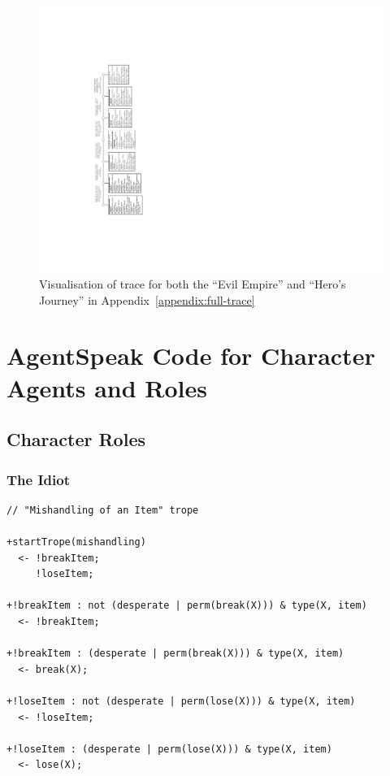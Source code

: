 \documentclass[11pt]{report}
\begin{document}
\begin{figure}[!p]
\centerline{\includegraphics[height=0.9\textheight]{hjee70-rot.pdf}}
\caption{Visualisation of trace for both the ``Evil Empire'' and ``Hero's Journey'' in Appendix~\ref{appendix:full-trace}}\label{fig:hjee-trace}
\end{figure}

\chapter{AgentSpeak Code for Character Agents and Roles}
\label{cha:agentspeak-roles}
\section{Character Roles}
\label{sec:asl-character-roles}
\subsection{The Idiot}

\begin{lstlisting}[showstringspaces=false,
label=lst:app-pjfull-idiotagent,caption={AgentSpeak code for the ``Idiot'' role}]
// "Mishandling of an Item" trope

+startTrope(mishandling)
  <- !breakItem;
     !loseItem;

+!breakItem : not (desperate | perm(break(X))) & type(X, item)
  <- !breakItem;

+!breakItem : (desperate | perm(break(X))) & type(X, item)
  <- break(X);

+!loseItem : not (desperate | perm(lose(X))) & type(X, item)
  <- !loseItem;

+!loseItem : (desperate | perm(lose(X))) & type(X, item)
  <- lose(X);
\end{lstlisting}
\end{document}
